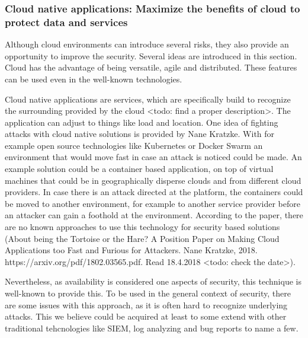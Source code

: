 \documentclass{article}
\begin{document}
\subsubsection{Cloud native applications: Maximize the benefits of cloud to protect data and services}
Although cloud environments can introduce several risks, they also provide an opportunity to improve the security. Several ideas are introduced in this section. Cloud has the advantage of being versatile, agile and distributed. These features can be used even in the well-known technologies.
\par
Cloud native applications are services, which are specifically build to recognize the surrounding provided by the cloud <todo: find a proper description>. The application can adjust to things like load and location. One idea of fighting attacks with cloud native solutions is provided by Nane Kratzke. With for example open source technologies like Kubernetes or Docker Swarm an environment that would move fast in case an attack is noticed could be made. An example solution could be a container based application, on top of virtual machines that could be in geographically disperse clouds and from different cloud providers. In case there is an attack directed at the platform, the containers could be moved to another environment, for example to another service provider before an attacker can gain a foothold at the environment. According to the paper, there are no known approaches to use this technology for security based solutions (About being the Tortoise or the Hare? A Position Paper on Making Cloud Applications too Fast and Furious for Attackers. Nane Kratzke, 2018. https://arxiv.org/pdf/1802.03565.pdf. Read 18.4.2018 <todo: check the date>). 
\par
Nevertheless, as availability is considered one aspects of security, this technique is well-known to provide this. To be used in the general context of security, there are some issues with this approach, as it is often hard to recognize underlying attacks. This we believe could be acquired at least to some extend with other traditional tehcnologies like SIEM, log analyzing and bug reports to name a few.
\end{document}
